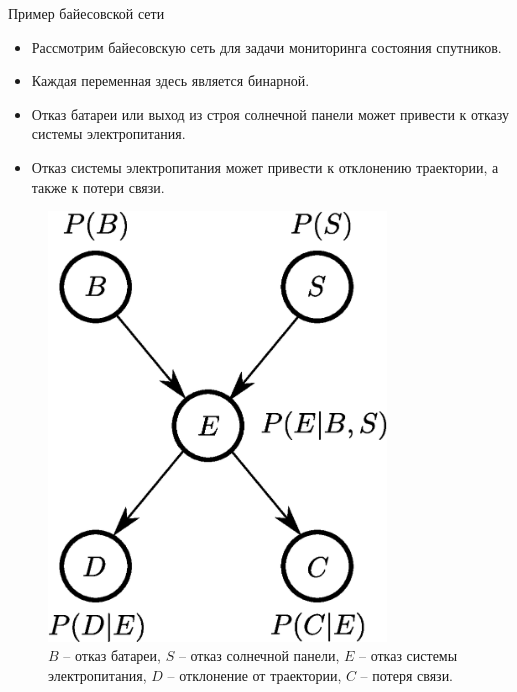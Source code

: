 \documentclass{beamer}
\begin{document}
\begin{frame}{Пример байесовской сети}
    \small
    \begin{minipage}[t]{0.49\textwidth}
        \begin{itemize}
            \item Рассмотрим байесовскую сеть для задачи мониторинга состояния спутников.
            \item Каждая переменная здесь является бинарной.
            \item Отказ батареи или выход из строя солнечной панели может привести к отказу системы электропитания.
            \item Отказ системы электропитания может привести к отклонению траектории, а также к потери связи.
        \end{itemize}
    \end{minipage}
    \begin{minipage}[t]{0.49\textwidth}
        \begin{figure}
        \includegraphics[width=0.8\textwidth]{bn_monitoring.eps}
        \caption{$B$ -- отказ батареи, $S$ -- отказ солнечной панели, $E$ -- отказ системы электропитания, $D$ -- отклонение от траектории, $C$ -- потеря связи.}
    \end{figure}
    \end{minipage}
\end{frame}
\end{document}
